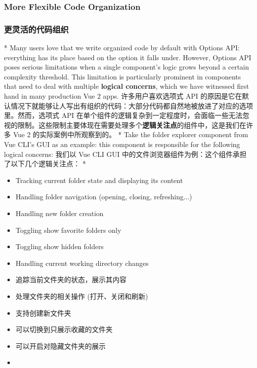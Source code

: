 \begin{paracol}{2}
\subsubsection{More Flexible Code Organization}
\switchcolumn
\subsubsection{更灵活的代码组织}
\switchcolumn[0]*%
Many users love that we write organized code by default with Options
API: everything has its place based on the option it falls under.
However, Options API poses serious limitations when a single component's
logic grows beyond a certain complexity threshold. This limitation is
particularly prominent in components that need to deal with multiple
\textbf{logical concerns}, which we have witnessed first hand in many
production Vue 2 apps.
\switchcolumn
许多用户喜欢选项式 API
的原因是它在默认情况下就能够让人写出有组织的代码：大部分代码都自然地被放进了对应的选项里。然而，选项式
API
在单个组件的逻辑复杂到一定程度时，会面临一些无法忽视的限制。这些限制主要体现在需要处理多个\textbf{逻辑关注点}的组件中，这是我们在许多
Vue 2 的实际案例中所观察到的。
\switchcolumn[0]*%
Take the folder explorer component from Vue CLI's GUI as an example:
this component is responsible for the following logical concerns:
\switchcolumn
我们以 Vue CLI GUI
中的文件浏览器组件为例：这个组件承担了以下几个逻辑关注点：
\switchcolumn[0]*%
\begin{itemize}
\item
  Tracking current folder state and displaying its content
\item
  Handling folder navigation (opening, closing, refreshing...)
\item
  Handling new folder creation
\item
  Toggling show favorite folders only
\item
  Toggling show hidden folders
\item
  Handling current working directory changes
\end{itemize}
\switchcolumn
\begin{itemize}
\item
  追踪当前文件夹的状态，展示其内容
\item
  处理文件夹的相关操作 (打开、关闭和刷新)
\item
  支持创建新文件夹
\item
  可以切换到只展示收藏的文件夹
\item
  可以开启对隐藏文件夹的展示
\item

\end{itemize}
\end{paracol}
